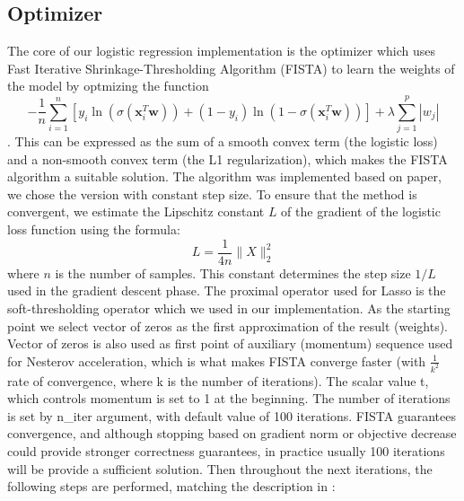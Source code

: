 \documentclass[8pt,a4paper]{extarticle}
\begin{document}
\subsection{Optimizer}
The core of our logistic regression implementation is the optimizer which uses Fast Iterative Shrinkage-Thresholding Algorithm (FISTA) to learn the weights of the model by optmizing the function \begin{equation}
     -\frac{1}{n} \sum_{i=1}^{n} \left[ y_i \ln(\sigma(\mathbf{x}_i^T \mathbf{w})) + (1 - y_i) \ln(1 - \sigma(\mathbf{x}_i^T \mathbf{w})) \right] + \lambda \sum_{j=1}^{p} |w_j|
\end{equation}. This can be expressed as the sum of a smooth convex term (the logistic loss) and a non-smooth convex term (the L1 regularization), which makes the FISTA algorithm a suitable solution. The algorithm was implemented based on \cite{beck2009fast} paper, we chose the version with constant step size. To ensure that the method is  convergent, we estimate the Lipschitz constant $L$ of the gradient of the logistic loss function using the formula:
    \begin{equation}
        L = \frac{1}{4n} \|X\|_2^2
    \end{equation}
    where $n$ is the number of samples. This constant determines the step size $1/L$ used in the gradient descent phase. The proximal operator used for Lasso is the soft-thresholding operator which we used in our implementation. As the starting point we select vector of zeros as the first approximation of the result (weights). Vector of zeros is also used as first point of auxiliary  (momentum) sequence used for Nesterov acceleration, which is what makes FISTA converge faster (with $\frac{1}{k^2}$ rate of convergence, where k is the number of iterations). The scalar value t, which controls momentum is set to 1 at the beginning. The number of iterations is set by n\_iter argument, with default value of 100 iterations. FISTA guarantees convergence, and although stopping based on gradient norm or objective decrease could provide stronger correctness guarantees, in practice usually 100 iterations will be provide a sufficient solution. Then throughout the next iterations, the following steps are performed, matching the description in \cite{beck2009fast}:
\end{document}
